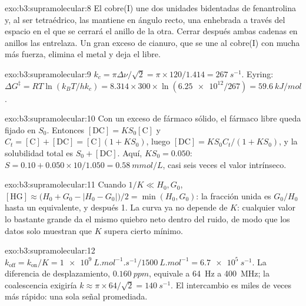 \begin{solution}{exo:b3:supramolecular:8}
El cobre(I) une dos unidades bidentadas de fenantrolina y, al ser tetraédrico, las mantiene
en ángulo recto, una enhebrada a través del espacio en el que se cerrará el anillo de la
otra. Cerrar después ambas cadenas en anillos las entrelaza. Un gran exceso de
cianuro, que se une al cobre(I) con mucha más fuerza, elimina el metal y deja
el  libre.
\end{solution}

\begin{solution}{exo:b3:supramolecular:9}
$k_c = \pi\Delta\nu/\sqrt2 = \pi \times 120/1.414 = \qty{267}{s^{-1}}$. Eyring:
$\Delta G^\ddagger = RT\ln(k_BT/hk_c) = 8.314 \times 300 \times \ln(\num{6.25e12}/267) = \qty{59.6}{kJ/mol}$.
\end{solution}

\begin{solution}{exo:b3:supramolecular:10}
Con un exceso de fármaco sólido, el fármaco libre queda fijado en $S_0$. Entonces $[\mathrm{DC}] = KS_0[\mathrm C]$ y
$C_t = [\mathrm C] + [\mathrm{DC}] = [\mathrm C](1 + KS_0)$, luego $[\mathrm{DC}] = KS_0C_t/(1 + KS_0)$, y la solubilidad total es $S_0 + [\mathrm{DC}]$. Aquí,
$KS_0 = 0.050$: $S = 0.10 + 0.050 \times 10/1.050 = \qty{0.58}{mmol/L}$, casi seis veces el valor intrínseco.
\end{solution}

\begin{solution}{exo:b3:supramolecular:11}
Cuando $1/K \ll H_0, G_0$, $[\mathrm{HG}] \approx \bigl(H_0 + G_0 - |H_0 - G_0|\bigr)/2 = \min(H_0, G_0)$: la fracción unida es $G_0/H_0$ hasta un
equivalente, y después 1. La curva ya no depende de $K$: cualquier valor lo bastante grande
da el mismo quiebro neto dentro del ruido, de modo que los datos solo muestran que $K$ supera
cierto mínimo.
\end{solution}

\begin{solution}{exo:b3:supramolecular:12}
$k_{\mathrm{off}} = k_{\mathrm{on}}/K = \qty{1e9}{L.mol^{-1}.s^{-1}}/\qty{1500}{L.mol^{-1}} = \qty{6.7e5}{s^{-1}}$. La diferencia de desplazamiento,
$\qty{0.160}{ppm}$, equivale a \qty{64}{Hz} a \qty{400}{MHz}; la coalescencia exigiría $k \approx \pi \times 64/\sqrt2 = \qty{140}{s^{-1}}$. El intercambio es
miles de veces más rápido: una sola señal promediada.
\end{solution}

